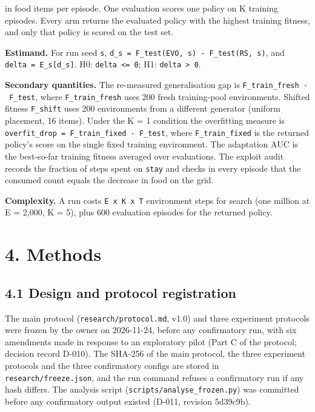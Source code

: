 \documentclass[
]{article}
\begin{document}
in food items per episode. One evaluation scores one policy on K
training episodes. Every arm returns the evaluated policy with the
highest training fitness, and only that policy is scored on the test
set.

\textbf{Estimand.} For run seed \texttt{s},
\texttt{d\_s\ =\ F\_test(EVO,\ s)\ -\ F\_test(RS,\ s)}, and
\texttt{delta\ =\ E\_s{[}d\_s{]}}. H0: \texttt{delta\ \textless{}=\ 0};
H1: \texttt{delta\ \textgreater{}\ 0}.

\textbf{Secondary quantities.} The re-measured generalisation gap is
\texttt{F\_train\_fresh\ -\ F\_test}, where \texttt{F\_train\_fresh}
uses 200 fresh training-pool environments. Shifted fitness
\texttt{F\_shift} uses 200 environments from a different generator
(uniform placement, 16 items). Under the K = 1 condition the overfitting
measure is \texttt{overfit\_drop\ =\ F\_train\_fixed\ -\ F\_test}, where
\texttt{F\_train\_fixed} is the returned policy's score on the single
fixed training environment. The adaptation AUC is the best-so-far
training fitness averaged over evaluations. The exploit audit records
the fraction of steps spent on \texttt{stay} and checks in every episode
that the consumed count equals the decrease in food on the grid.

\textbf{Complexity.} A run costs \texttt{E\ x\ K\ x\ T} environment
steps for search (one million at E = 2,000, K = 5), plus 600 evaluation
episodes for the returned policy.

\section{4. Methods}\label{methods}

\subsection{4.1 Design and protocol
registration}\label{design-and-protocol-registration}

The main protocol (\texttt{research/protocol.md}, v1.0) and three
experiment protocols were frozen by the owner on 2026-11-24, before any
confirmatory run, with six amendments made in response to an exploratory
pilot (Part C of the protocol; decision record D-010). The SHA-256 of
the main protocol, the three experiment protocols and the three
confirmatory configs are stored in \texttt{research/freeze.json}, and
the run command refuses a confirmatory run if any hash differs. The
analysis script (\texttt{scripts/analyse\_frozen.py}) was committed
before any confirmatory output existed (D-011, revision 5d39c9b).
\end{document}
